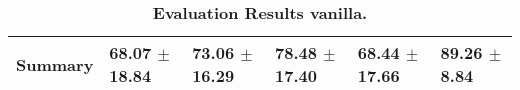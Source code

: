 \begin{table}[htb]
{\begin{tabular}{llllll}
\midrule
\textbf{Summary                                  } &                  \phantom{0}68.07 $\pm$ 18.84 &                      \phantom{0}73.06 $\pm$ 16.29 &                  \phantom{0}78.48 $\pm$ 17.40 &                  \phantom{0}68.44 $\pm$ 17.66 &  \phantom{0}89.26 $\pm$ \phantom{0}8.84 \\
\bottomrule
\end{tabular}%
}
\caption{\textbf{Evaluation Results vanilla.}}
\label{tab:eval-results}
\end{table}


